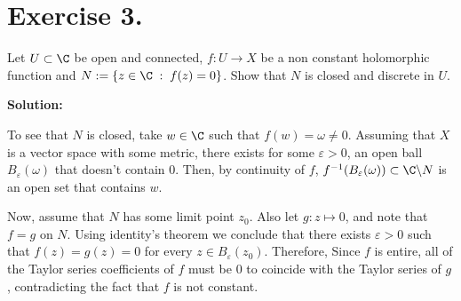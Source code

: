 \section*{Exercise 3.}

Let $U \subset \C$ be open and connected, $f: U \to X$ be a non constant holomorphic function and $N := \{z \in \C \;:\; f(z) = 0\}$. Show that $N$ is closed and discrete in $U$.

\textbf{Solution:}

To see that $N$ is closed, take $w \in \C$ such that $f(w) = \omega \neq 0$. Assuming that $X$ is a vector space with some metric, there exists for some $\varepsilon > 0$, an open ball $B_\varepsilon(\omega)$ that doesn't contain $0$. Then, by continuity of $f$, $f^{-1}(B_\varepsilon(\omega)) \subset \C \backslash N$ is an open set that contains $w$.

Now, assume that $N$ has some limit point $z_0$. Also let $g: z \mapsto 0$, and note that $f = g$ on $N$. Using identity's theorem we conclude that there exists $\varepsilon > 0$ such that $f(z) = g(z) = 0$ for every $z\in B_\varepsilon(z_0)$. Therefore, Since $f$ is entire, all of the Taylor series coefficients of $f$ must be 0 to coincide with the Taylor series of $g$, contradicting the fact that $f$ is not constant.